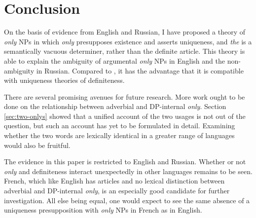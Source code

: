 \section{Conclusion \label{sec:conclusion}}
On the basis of evidence from English and Russian, I have proposed a theory of \textit{only} NPs in which \textit{only} presupposes existence and asserts uniqueness, and \textit{the} is a semantically vacuous determiner, rather than the definite article. This theory is able to explain the ambiguity of argumental \textit{only} NPs in English and the non-ambiguity in Russian. Compared to \citet{cb2015}, it has the advantage that it is compatible with uniqueness theories of definiteness.

There are several promising avenues for future research. More work ought to be done on the relationship between adverbial and DP-internal \textit{only}. Section \ref{sec:two-onlys} showed that a unified account of the two usages is not out of the question, but such an account has yet to be formulated in detail. Examining whether the two words are lexically identical in a greater range of languages would also be fruitful.

The evidence in this paper is restricted to English and Russian. Whether or not \textit{only} and definiteness interact unexpectedly in other languages remains to be seen. French, which like English has articles and no lexical distinction between adverbial and DP-internal \textit{only}, is an especially good candidate for further investigation. All else being equal, one would expect to see the same absence of a uniqueness presupposition with \textit{only} NPs in French as in English.